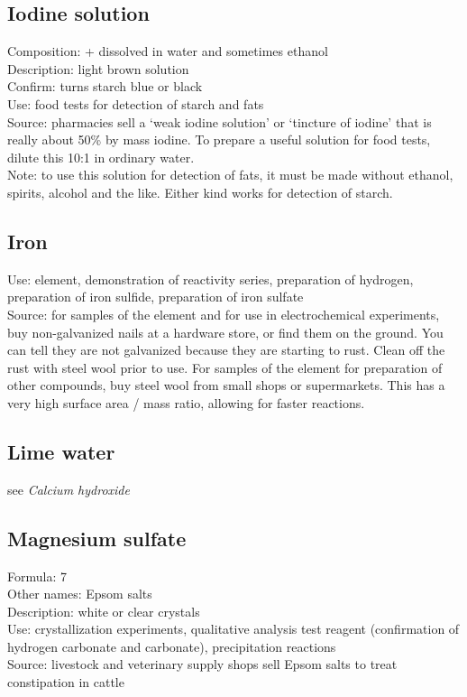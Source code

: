 \subsection{Iodine solution}
\label{sec:iodinesol}
Composition:  +  dissolved in water and sometimes ethanol\\
Description: light brown solution\\
Confirm: turns starch blue or black\\
Use: food tests for detection of starch and fats\\
Source: pharmacies sell a ‘weak iodine solution’ 
or ‘tincture of iodine’ that is really about 50\% by mass iodine. 
To prepare a useful solution for food tests, 
dilute this 10:1 in ordinary water.\\
Note: to use this solution for detection of fats, 
it must be made without ethanol, 
spirits, 
alcohol and the like. 
Either kind works for detection of starch.
\subsection{Iron}
\label{sec:iron}
Use: element, 
demonstration of reactivity series, 
preparation of hydrogen, 
preparation of iron sulfide, 
preparation of iron sulfate\\
Source: for samples of the element 
and for use in electrochemical experiments, 
buy non-galvanized nails at a hardware store, 
or find them on the ground. 
You can tell they are not galvanized because they are starting to rust. 
Clean off the rust with steel wool prior to use. 
For samples of the element for preparation of other compounds, 
buy steel wool from small shops or supermarkets. 
This has a very high surface area / mass ratio, 
allowing for faster reactions.

\subsection{Lime water}
see \textit{Calcium hydroxide}

\subsection{Magnesium sulfate}
\label{sec:magsulfate}
Formula:  7\\
Other names: Epsom salts\\
Description: white or clear crystals\\
Use: crystallization experiments, 
qualitative analysis test reagent 
(confirmation of hydrogen carbonate and carbonate), 
precipitation reactions\\
Source: livestock and veterinary supply shops sell Epsom salts 
to treat constipation in cattle
